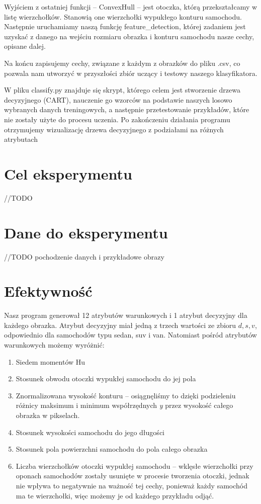 \documentclass{article}
\begin{document}
Wyjściem z ostatniej funkcji -- ConvexHull -- jest otoczka, którą przekształcamy w listę wierzchołków. Stanowią one wierzchołki wypukłego konturu samochodu. Następnie uruchamiamy naszą funkcję feature\_detection, której zadaniem jest uzyskać z danego na wejściu rozmiaru obrazka i konturu samochodu nasze cechy, opisane dalej.

Na końcu zapisujemy cechy, związane z każdym z obrazków do pliku .csv, co pozwala nam utworzyć w przyszłości zbiór uczący i testowy naszego klasyfikatora.

W pliku classify.py znajduje się skrypt, którego celem jest stworzenie drzewa decyzyjnego (CART), nauczenie go wzorców na podstawie naszych losowo wybranych danych treningowych, a następnie przetestowanie przykładów, które nie zostały użyte do procesu uczenia. Po zakończeniu działania programu otrzymujemy wizualizację drzewa decyzyjnego z podziałami na różnych atrybutach
 
\section{Cel eksperymentu}
//TODO
\section{Dane do eksperymentu}
//TODO pochodzenie danych i przykładowe obrazy
\section{Efektywność}
Nasz program generował 12 atrybutów warunkowych i 1 atrybut decyzyjny dla każdego obrazka. Atrybut decyzyjny miał jedną z trzech wartości ze zbioru ${d, s, v}$, odpowiednio dla samochodów typu sedan, suv i van. Natomiast pośród atrybutów warunkowych możemy wyróżnić:
\begin{enumerate}
\item Siedem momentów Hu
\item Stosunek obwodu otoczki wypukłej samochodu do jej pola
\item Znormalizowana wysokość konturu -- osiągnęliśmy to dzięki podzieleniu różnicy maksimum i minimum współrzędnych \textit{y} przez wysokość całego obrazka w pikselach.
\item Stosunek wysokości samochodu do jego długości
\item Stosunek pola powierzchni samochodu do pola całego obrazka
\item Liczba wierzchołków otoczki wypukłej samochodu -- wklęsłe wierzchołki przy oponach samochodów zostały usunięte w procesie tworzenia otoczki, jednak nie wpływa to negatywnie na ważność tej cechy, ponieważ każdy samochód ma te wierzchołki, więc możemy je od każdego przykładu odjąć.
\end{enumerate}
\end{document}
